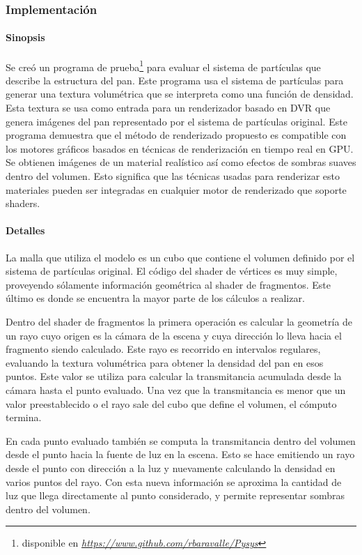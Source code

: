 \documentclass[oneside,a4paper,spanish,links]{amca}
\begin{document}
\subsubsection{Implementación}

\paragraph{Sinopsis}

Se cre\'o un programa de prueba\footnote{disponible en
  \emph{\url{https://www.github.com/rbaravalle/Pysys}}} para evaluar el sistema de partículas que describe la estructura del
pan. Este programa usa el sistema de partículas para generar una
textura volumétrica que se interpreta como una función de
densidad. Esta textura se usa como entrada para un renderizador basado
en DVR que genera imágenes del pan representado por el sistema de
partículas original. Este programa demuestra que el método de
renderizado propuesto es compatible con los motores gráficos basados en
técnicas de renderización en tiempo real en GPU. Se obtienen imágenes
de un material realístico así como efectos de sombras suaves dentro
del volumen. Esto significa que las técnicas usadas para renderizar
esto materiales pueden ser integradas en cualquier motor de
renderizado que soporte shaders.

\paragraph{Detalles}

La malla que utiliza el modelo es un cubo que contiene el volumen
definido por el sistema de partículas original. El código del shader
de vértices es muy simple, proveyendo sólamente información geométrica
al shader de fragmentos. Este último es donde se encuentra la mayor
parte de los cálculos a realizar.

Dentro del shader de fragmentos la primera operaci\'on es calcular la
geometría de un rayo cuyo origen es la cámara de la escena y cuya
dirección lo lleva hacia el fragmento siendo calculado. Este rayo es
recorrido en intervalos regulares, evaluando la textura volumétrica
para obtener la densidad del pan en esos puntos. Este valor se utiliza
para calcular la transmitancia acumulada desde la cámara hasta el
punto evaluado. Una vez que la transmitancia es menor que un valor
preestablecido o el rayo sale del cubo que define el volumen, el
cómputo termina.

En cada punto evaluado también se computa la transmitancia dentro del
volumen desde el punto hacia la fuente de luz en la escena. Esto se
hace emitiendo un rayo desde el punto con dirección a la luz
y nuevamente calculando la densidad en varios puntos del rayo. Con esta
nueva información se aproxima la cantidad de luz que llega
directamente al punto considerado, y permite representar sombras dentro
del volumen.
\end{document}
